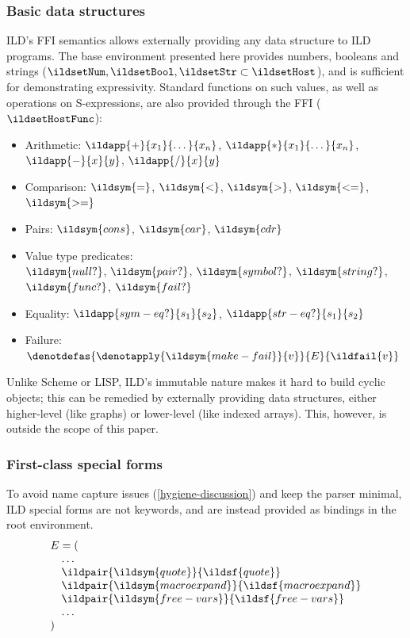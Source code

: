 \subsubsection{Basic data structures}
ILD's FFI semantics allows externally providing any data structure to ILD programs.
The base environment presented here provides numbers, booleans and strings
(\(\ildsetNum, \ildsetBool, \ildsetStr \subset \ildsetHost\)), and is sufficient
for demonstrating expressivity. Standard functions on such values, as well as
operations on S-expressions, are also provided through the FFI (\(\ildsetHostFunc\)):
\vspace{-4pt} %
\begin{itemize}
  \item Arithmetic: \(\ildapp{+}{x_1}{\dots}{x_n}\), \(\ildapp{*}{x_1}{\dots}{x_n}\),
    \(\ildapp{-}{x}{y}\), \(\ildapp{/}{x}{y}\)
  \item Comparison: \(\ildsym{=}\), \(\ildsym{<}\),
    \(\ildsym{>}\), \(\ildsym{<=}\), \(\ildsym{>=}\)
  \item Pairs: \(\ildsym{cons}\), \(\ildsym{car}\), \(\ildsym{cdr}\)
  \item Value type predicates:\\ \(\ildsym{null?}\), \(\ildsym{pair?}\),
    \(\ildsym{symbol?}\), \(\ildsym{string?}\), \(\ildsym{func?}\),
    \(\ildsym{fail?}\)
  \item Equality: \(\ildapp{sym-eq?}{s_1}{s_2}\), \(\ildapp{str-eq?}{s_1}{s_2}\)
  \item Failure: \(\denotdefas{\denotapply{\ildsym{make-fail}}{v}}{E}{\ildfail{v}}\)
\end{itemize}
Unlike Scheme or LISP, ILD's immutable nature makes it hard to build cyclic
objects; this can be remedied by externally providing data structures,
either higher-level (like graphs) or lower-level (like indexed arrays).
This, however, is outside the scope of this paper.

\subsubsection{First-class special forms}
To avoid name capture issues (\cref{hygiene-discussion}) and keep the parser
minimal, ILD special forms are not keywords, and are instead
provided as bindings in the root environment.
\[
  \begin{array}{@{}l@{}}
    E = ( \\
    \quad \dots \\
    \quad \ildpair{\ildsym{quote}}{\ildsf{quote}} \\
    \quad \ildpair{\ildsym{macroexpand}}{\ildsf{macroexpand}} \\
    \quad \ildpair{\ildsym{free-vars}}{\ildsf{free-vars}} \\
    \quad \dots \\
    )
  \end{array}
\]

